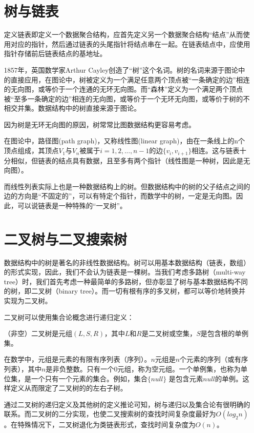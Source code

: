 \section{树与链表}

定义链表即定义一个数据聚合结构，应首先定义另一个数据聚合结构“结点”从而使用对应的指针，然后通过链表的头尾指针将结点串在一起。在链表结点中，应使用指针存储前后链表结点的基地址。

1857年，英国数学家Arthur Cayley创造了“树”\cite{enwiki:1017966184}这个名词。树的名词来源于图论中的直接应用，在图论中，树被定义为一个满足任意两个顶点被“一条确定的边”相连的无向图，或等价于一个连通的无环无向图。而“森林”定义为一个满足两个顶点被“至多一条确定的边”相连的无向图，或等价于一个无环无向图，或等价于树的不相交并集。数据结构中的树直接来源于图论。

因为树是无环无向图的原因，树常常比图数据结构更容易考虑。

在图论中，路径图(path graph)\cite{enwiki:1005960330}，又称线性图(linear graph)，由在一条线上的n个顶点组成，其顶点$V_1$与$V_n$被属于$i=1,2, ... ,n-1$的边$\{v_i, v_{i+1}\}$相连。这与链表十分相似，但链表的结点具有数据，且至多有两个指针（线性图是一种树，因此是无向图）。

而线性列表实际上也是一种数据结构上的树。但数据结构中的树的父子结点之间的边的方向是“不固定的”，可以有特定个指针，而数学中的树，一定是无向图。因此，可以说链表是一种特殊的“一叉树”。


\section{二叉树与二叉搜索树}

数据结构中的树是著名的非线性数据结构。树可以用基本数据结构（链表，数组）的形式实现，因此，我们不会认为链表是一棵树。当我们考虑多路树（multi-way tree）时，我们首先考虑一种最简单的多路树，但亦彰显了树与基本数据结构不同的树，即二叉树（binary tree）。而一切有根有序的多叉树，都可以等价地转换并实现为二叉树。

二叉树可以使用集合论概念进行递归定义：

（非空）二叉树是元组$(L,S,R)$，其中$L$和$R$是二叉树或空集，$S$是包含根的单例集。

在数学中，元组是元素的有限有序列表（序列）。$n$元组是$n$个元素的序列（或有序列表），其中$n$是非负整数。只有一个$0$元组，称为空元组。一个单例集，也称为单位集，是一个只有一个元素的集合。例如，集合$\{null\}$ 是包含元素$null$的单例。这样定义从而限定了二叉树的的左右子树。

通过二叉树的递归定义及其他树的定义推论可知，树与递归以及集合论有很明确的联系。而二叉树的二分实现，也使二叉搜索树的查找时间复杂度最好为$O(log_2n)$。在特殊情况下，二叉树退化为类链表形式，查找时间复杂度为$O(n)$。

